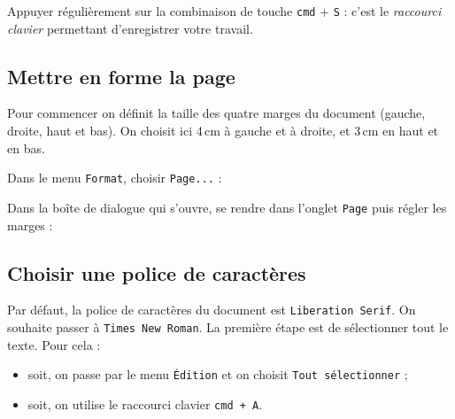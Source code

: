 
Appuyer régulièrement sur la combinaison de touche \texttt{cmd} + \texttt{S} : c'est le \emph{raccourci clavier} permettant d'enregistrer votre travail.









\subsection{Mettre en forme la page}

Pour commencer on définit la taille des quatre marges du document (gauche, droite, haut et bas). On choisit ici 4\,cm à gauche et à droite, et 3\,cm en haut et en bas.

Dans le menu \texttt{Format}, choisir \texttt{Page...} :    


Dans la boîte de dialogue qui s'ouvre, se rendre dans l'onglet \texttt{Page} puis régler les marges :  












\subsection{Choisir une police de caractères}

Par défaut, la police de caractères du document est \texttt{Liberation Serif}. On souhaite passer à \texttt{Times New Roman}. La première étape est de sélectionner tout le texte. Pour cela :

\begin{itemize}
\item soit, on passe par le menu \texttt{Édition} et on choisit \texttt{Tout sélectionner} ;
\item soit, on utilise le raccourci clavier \texttt{cmd + A}.    
\end{itemize}

